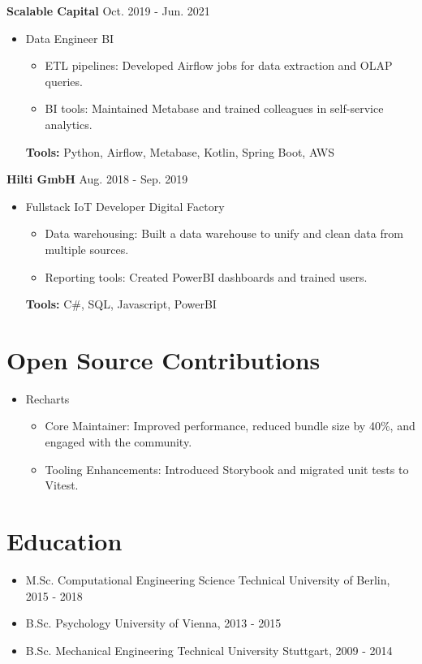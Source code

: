 \documentclass[letterpaper,11pt]{article}
\newcommand{\roleSpacing}{\vspace{4pt}}
\newcommand{\role}[2]{\item{#1 \hfill #2 \\}} %
\newcommand{\station}[2]{\textbf{#1}  \hfill #2 \\} %
\newcommand{\project}[2]{\item\small{#1: #2}} %
\newcommand{\resumeSubHeadingListStart}{\begin{itemize}[leftmargin=*]}
\newcommand{\resumeSubHeadingListEnd}{\end{itemize}}
\newcommand{\projectliststart}{\begin{itemize}[leftmargin=*] \vspace{-5pt} }
\newcommand{\projectlistend}{\end{itemize}\vspace{-5pt}}
\begin{document}
\roleSpacing

\station{Scalable Capital}{Oct. 2019 - Jun. 2021}
\resumeSubHeadingListStart
\role{Data Engineer}{BI}
\projectliststart
\project{ETL pipelines}{Developed Airflow jobs for data extraction and OLAP queries.}
\project{BI tools}{Maintained Metabase and trained colleagues in self-service analytics.}
\projectlistend
\textbf{Tools:} Python, Airflow, Metabase, Kotlin, Spring Boot, AWS
\resumeSubHeadingListEnd

\roleSpacing

\station{Hilti GmbH}{Aug. 2018 - Sep. 2019}
\resumeSubHeadingListStart
\role{Fullstack IoT Developer}{Digital Factory}
\projectliststart
\project{Data warehousing}{Built a data warehouse to unify and clean data from multiple sources.}
\project{Reporting tools}{Created PowerBI dashboards and trained users.}
\projectlistend
\textbf{Tools:} C\#, SQL, Javascript, PowerBI
\resumeSubHeadingListEnd

\section{Open Source Contributions}

\resumeSubHeadingListStart
\role{Recharts}{}
\projectliststart
\project{Core Maintainer}{Improved performance, reduced bundle size by 40\%, and engaged with the community.}
\project{Tooling Enhancements}{Introduced Storybook and migrated unit tests to Vitest.}
\projectlistend
\resumeSubHeadingListEnd

\section{Education}
\resumeSubHeadingListStart
\role{M.Sc. Computational Engineering Science}{Technical University of Berlin, 2015 - 2018}
\role{B.Sc. Psychology}{University of Vienna, 2013 - 2015}
\role{B.Sc. Mechanical Engineering}{Technical University Stuttgart, 2009 - 2014}
\resumeSubHeadingListEnd
\end{document}
